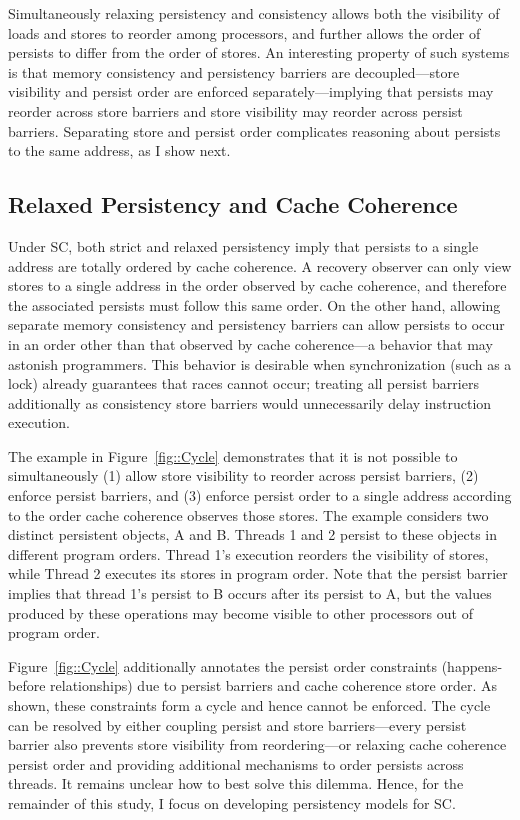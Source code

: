 Simultaneously relaxing persistency and consistency allows both the visibility of loads and stores to reorder among processors, and further allows the order of persists to differ from the order of stores.
An interesting property of such systems is that memory consistency and persistency barriers are decoupled---store visibility and persist order are enforced separately---implying that persists may reorder across store barriers and store visibility may reorder across persist barriers.
Separating store and persist order complicates reasoning about persists to the same address, as I show next.

\subsection{Relaxed Persistency and Cache Coherence}
Under SC, both strict and relaxed persistency imply that persists to a single address are totally ordered by cache coherence.
A recovery observer can only view stores to a single address in the order observed by cache coherence, and therefore the associated persists must follow this same order.
On the other hand, allowing separate memory consistency and persistency barriers can allow persists to occur in an order other than that observed by cache coherence---a behavior that may astonish programmers.
This behavior is desirable when synchronization (such as a lock) already guarantees that races cannot occur; treating all persist barriers additionally as consistency store barriers would unnecessarily delay instruction execution.



The example in Figure~\ref{fig::Cycle} demonstrates that it is not possible to simultaneously (1) allow store visibility to reorder across persist barriers, (2) enforce persist barriers, and (3) enforce persist order to a single address according to the order cache coherence observes those stores.
The example considers two distinct persistent objects, A and B.
Threads 1 and 2 persist to these objects in different program orders.
Thread 1's execution reorders the visibility of stores, while Thread 2 executes its stores in program order.
Note that the persist barrier implies that thread 1's persist to B occurs after its persist to A, but the values produced by these operations may become visible to other processors out of program order.

Figure~\ref{fig::Cycle} additionally annotates the persist order constraints (happens-before relationships) due to persist barriers and cache coherence store order.
As shown, these constraints form a cycle and hence cannot be enforced.
The cycle can be resolved by either coupling persist and store barriers---every persist barrier also prevents store visibility from reordering---or relaxing cache coherence persist order and providing additional mechanisms to order persists across threads.
It remains unclear how to best solve this dilemma.
Hence, for the remainder of this study, I focus on developing persistency models for SC.

